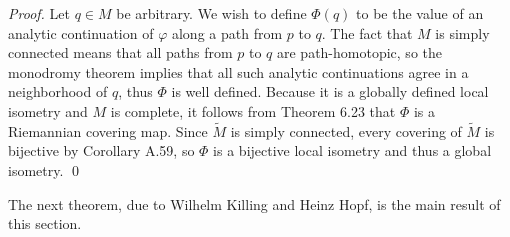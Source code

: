 \emph{Proof.} Let $q \in M$ be arbitrary. We wish to define $\Phi(q)$ to be the value of an analytic continuation of $\varphi$ along a path from $p$ to $q$. The fact that $M$ is simply connected means that all paths from $p$ to $q$ are path-homotopic, so the monodromy theorem implies that all such analytic continuations agree in a neighborhood of $q$, thus $\Phi$ is well defined. Because it is a globally defined local isometry and $M$ is complete, it follows from Theorem 6.23 that $\Phi$ is a Riemannian covering map. Since $\tilde{M}$ is simply connected, every covering of $\tilde{M}$ is bijective by Corollary A.59, so $\Phi$ is a bijective local isometry and thus a global isometry. \qed


The next theorem, due to Wilhelm Killing and Heinz Hopf, is the main result of this section.

